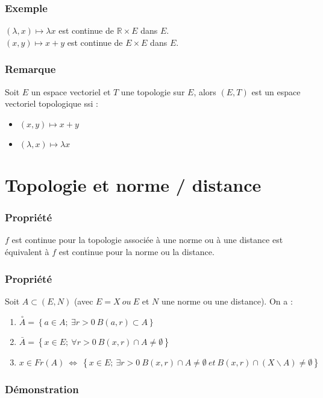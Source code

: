 \documentclass[a4paper, oneside]{report}
\newcommand{\x}{\times}
\newcommand{\R}{\mathbb{R}}
\newcommand{\ev}{espace vectoriel }
\newcommand{\cerc}[1]{\overset{\circ}{#1}}
\begin{document}
\subsubsection{Exemple}
$(\lambda , x)\mapsto \lambda x$ est continue de $\R \x E$ dans $E$.\\
$(x , y)\mapsto x+y$ est continue de $E \x E$ dans $E$.\\

\subsubsection{Remarque}
Soit $E$ un \ev et $T$ une topologie sur $E$, alors $(E,T)$ est un \ev topologique ssi :
\begin{itemize}
\item $(x,y) \mapsto x+y$
\item $(\lambda , x) \mapsto \lambda x$
\end{itemize}

\section{Topologie et norme / distance}

\subsubsection{Propriété}

$f$ est continue pour la topologie associée à une norme ou à une distance est équivalent à $f$ est continue pour la norme ou la distance.

\subsubsection{Propriété}
Soit $A \subset (E,N)$ (avec $E=X~ou~E$ et $N$ une norme ou une distance). On a :
\begin{enumerate}
\item $\cerc{A} = \left\{a \in A;~\exists r >0~B(a,r)\subset A \right\}$
\item $\bar{A} = \left\{x\in E;~\forall r>0~ B(x,r) \cap A \neq \emptyset \right\}$
\item $x\in Fr(A)~\Leftrightarrow~\left\{x\in E;~ \exists r>0~ B(x,r)\cap A\neq \emptyset~et~ B(x,r)\cap (X\backslash A)\neq \emptyset \right\}$
\end{enumerate}

\subsubsection{Démonstration}
\end{document}
